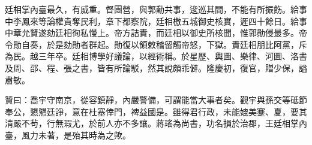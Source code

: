 \begin{pinyinscope}
廷相掌內臺最久，有威重。督團營，與郭勳共事，逡巡其間，不能有所振飭。給事中李鳳來等論權貴奪民利，章下都察院，廷相檄五城御史核實，遲四十餘日。給事中章允賢遂劾廷相徇私慢上。帝方詰責，而廷相以御史所核聞，惟郭勛侵最多。帝令勛自奏，於是劾勛者群起。勛復以領敕稽留觸帝怒，下獄。責廷相朋比阿黨，斥為民。越三年卒。廷相博學好議論，以經術稱。於星歷、輿圖、樂律、河圖、洛書及周、邵、程、張之書，皆有所論駁，然其說頗乖僻。隆慶初，復官，贈少保，謚肅敏。

贊曰：喬宇守南京，從容鎮靜，內嚴警備，可謂能當大事者矣。觀宇與孫交等砥節奉公，懇懇廷諍，意在杜塞倖門，裨益國是。雖得君行政，未能媲美蹇、夏，要其清嚴不茍，行無瑕尤，於前人亦不多讓。蔣瑤為尚書，功名損於治郡，王廷相掌內臺，風力未著，是殆其時為之歟。


\end{pinyinscope}